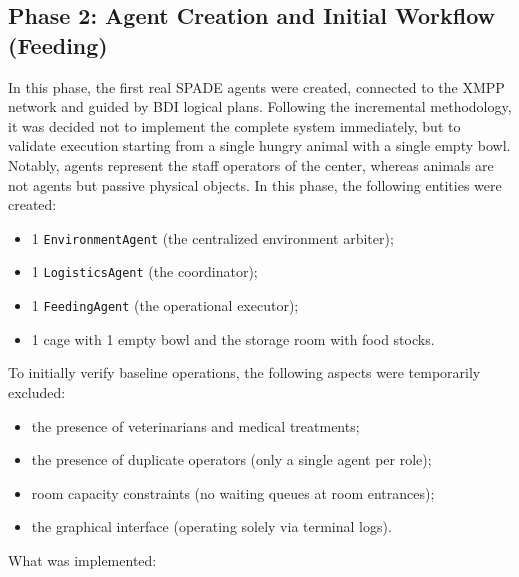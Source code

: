 \documentclass{article}
\renewcommand{\_}{\oldtextunderscore\allowbreak}
\begin{document}
\subsection{Phase 2: Agent Creation and Initial Workflow (Feeding)}
In this phase, the first real SPADE agents were created, connected to the XMPP network and guided by BDI logical plans. Following the incremental methodology, it was decided not to implement the complete system immediately, but to validate execution starting from a single hungry animal with a single empty bowl. Notably, agents represent the staff operators of the center, whereas animals are not agents but passive physical objects.
In this phase, the following entities were created:
\begin{itemize}
    \item 1 \texttt{EnvironmentAgent} (the centralized environment arbiter);
    \item 1 \texttt{LogisticsAgent} (the coordinator);
    \item 1 \texttt{FeedingAgent} (the operational executor);
    \item 1 cage with 1 empty bowl and the storage room with food stocks.
\end{itemize}
To initially verify baseline operations, the following aspects were temporarily excluded:
\begin{itemize}
    \item the presence of veterinarians and medical treatments;
    \item the presence of duplicate operators (only a single agent per role);
    \item room capacity constraints (no waiting queues at room entrances);
    \item the graphical interface (operating solely via terminal logs).
\end{itemize}
What was implemented:
\end{document}
